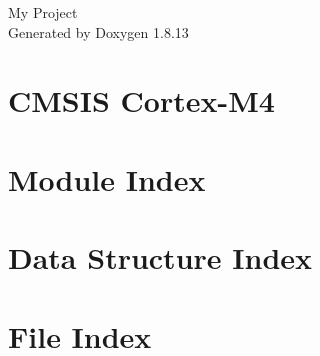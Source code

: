 \documentclass[twoside]{book}
\newcommand{\+}{\discretionary{\mbox{\scriptsize$\hookleftarrow$}}{}{}}
\newcommand{\clearemptydoublepage}{%
  \newpage{\pagestyle{empty}\cleardoublepage}%
}
\begin{document}
\hypersetup{pageanchor=false,
             bookmarksnumbered=true,
             pdfencoding=unicode
            }
\begin{titlepage}
\vspace*{7cm}
\begin{center}%
{\Large My Project }\\
\vspace*{1cm}
{\large Generated by Doxygen 1.8.13}\\
\end{center}
\end{titlepage}
\clearemptydoublepage
{}
\tableofcontents
\clearemptydoublepage
{}
\hypersetup{pageanchor=true}

\chapter{C\+M\+S\+IS Cortex-\/\+M4}
\label{index}\hypertarget{index}{}
\chapter{Module Index}

\chapter{Data Structure Index}

\chapter{File Index}

\end{document}
